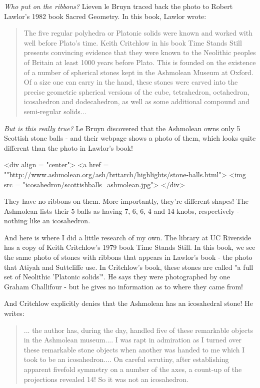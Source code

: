 \emph{Who put on the ribbons?}  Lieven le Bruyn traced back the photo to 
Robert Lawlor's 1982 book Sacred Geometry.  In this book, Lawlor wrote:

\begin{quote}
   The five regular polyhedra or Platonic solids were known and 
   worked with well before Plato's time.  Keith Critchlow in his 
   book Time Stands Still presents convincing evidence that they 
   were known to the Neolithic peoples of Britain at least 1000 
   years before Plato.  This is founded on the existence of a number 
   of spherical stones kept in the Ashmolean Museum at Oxford. 
   Of a size one can carry in the hand, these stones were carved into 
   the precise geometric spherical versions of the cube, tetrahedron, 
   octahedron, icosahedron and dodecahedron, as well as some additional
   compound and semi-regular solids... 
\end{quote}

\emph{But is this really true?}  Le Bruyn discovered that the Ashmolean owns 
only 5 Scottish stone balls - and their webpage shows a photo of them,
which looks quite different than the photo in Lawlor's book!  

<div align = "center">
<a href = ""http://www.ashmolean.org/ash/britarch/highlights/stone-balls.html">
<img src = "icosahedron/scottishballs_ashmolean.jpg">
</div>

They have no ribbons on them.  More importantly, they're different
shapes!  The Ashmolean lists their 5 balls as having 7, 6, 6, 4 and 14
knobs, respectively - nothing like an icosahedron.

And here is where I did a little research of my own.  The library 
at UC Riverside has a copy of Keith Critchlow's 1979 book Time 
Stands Still.  In this book, we see the same photo of stones with 
ribbons that appears in Lawlor's book - the photo that Atiyah and 
Suttcliffe use.  In Critchlow's book, these stones are called "a full 
set of Neolithic 'Platonic solids'".  He says they were photographed 
by one Graham Challifour - but he gives no information as to where 
they came from!

And Critchlow explicitly denies that the Ashmolean has an icosahedral
stone!  He writes:

\begin{quote}
   ... the author has, during the day, handled five of these 
   remarkable objects in the Ashmolean museum.... I was rapt 
   in admiration as I turned over these remarkable stone objects 
   when another was handed to me which I took to be an icosahedron.... 
   On careful scrutiny, after establishing apparent fivefold symmetry 
   on a number of the axes, a count-up of the projections revealed 14! 
   So it was not an icosahedron. 
\end{quote}

